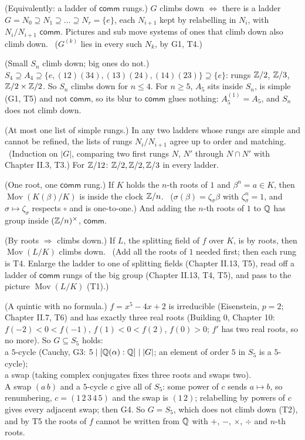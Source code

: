 \begin{lines}
\item[\lab{T1}] (Equivalently: a ladder of $\mathsf{comm}$ rungs.) $G$ climbs down $\iff$ there is a ladder $G = N_0 \supseteq N_1 \supseteq \dots \supseteq N_r = \{e\}$, each $N_{i+1}$ kept by relabelling in $N_i$, with $N_i / N_{i+1}$ $\mathsf{comm}$. Pictures and sub move systems of ones that climb down also climb down. \ ($G^{(k)}$ lies in every such $N_k$, by G1, T4.)
\item[\lab{T2}] (Small $S_n$ climb down; big ones do not.) $S_4 \supseteq A_4 \supseteq \{e, (12)(34), (13)(24), (14)(23)\} \supseteq \{e\}$: rungs $\mathbb{Z}/2$, $\mathbb{Z}/3$, $\mathbb{Z}/2 \times \mathbb{Z}/2$. So $S_n$ climbs down for $n \le 4$. For $n \ge 5$, $A_5$ sits inside $S_n$, is simple (G1, T5) and not $\mathsf{comm}$, so its blur to $\mathsf{comm}$ glues nothing: $A_5^{(1)} = A_5$, and $S_n$ does not climb down.
\item[\lab{T3}] (At most one list of simple rungs.) In any two ladders whose rungs are simple and cannot be refined, the lists of rungs $N_i / N_{i+1}$ agree up to order and matching. \ (Induction on $|G|$, comparing two first rungs $N$, $N'$ through $N \cap N'$ with Chapter II.3, T3.) For $\mathbb{Z}/12$: $\mathbb{Z}/2, \mathbb{Z}/2, \mathbb{Z}/3$ in every ladder.
\item[\lab{T4}] (One root, one $\mathsf{comm}$ rung.) If $K$ holds the $n$-th roots of $1$ and $\beta^n = a \in K$, then $\operatorname{Mov}(K(\beta)/K)$ is inside the clock $\mathbb{Z}/n$. \ ($\sigma(\beta) = \zeta_\sigma \beta$ with $\zeta_\sigma^n = 1$, and $\sigma \mapsto \zeta_\sigma$ respects $\circ$ and is one-to-one.) And adding the $n$-th roots of $1$ to $\mathbb{Q}$ has group inside $(\mathbb{Z}/n)^\times$, $\mathsf{comm}$.
\item[\lab{T5}] (By roots $\Rightarrow$ climbs down.) If $L$, the splitting field of $f$ over $K$, is by roots, then $\operatorname{Mov}(L/K)$ climbs down. \ (Add all the roots of $1$ needed first; then each rung is T4. Enlarge the ladder to one of splitting fields (Chapter II.13, T5), read off a ladder of $\mathsf{comm}$ rungs of the big group (Chapter II.13, T4, T5), and pass to the picture $\operatorname{Mov}(L/K)$ (T1).)
\item[\lab{T6}] (A quintic with no formula.) $f = x^5 - 4x + 2$ is irreducible (Eisenstein, $p = 2$; Chapter II.7, T6) and has exactly three real roots (Building 0, Chapter 10: $f(-2) < 0 < f(-1)$, $f(1) < 0 < f(2)$, $f(0) > 0$; $f'$ has two real roots, so no more). So $G \subseteq S_5$ holds: \\
a $5$-cycle (Cauchy, G3: $5 \mid [\mathbb{Q}(\alpha) : \mathbb{Q}] \mid |G|$; an element of order $5$ in $S_5$ is a $5$-cycle); \\
a swap (taking complex conjugates fixes three roots and swaps two). \\
A swap $(a\, b)$ and a $5$-cycle $c$ give all of $S_5$: some power of $c$ sends $a \mapsto b$, so renumbering, $c = (1\,2\,3\,4\,5)$ and the swap is $(1\,2)$; relabelling by powers of $c$ gives every adjacent swap; then G4. So $G = S_5$, which does not climb down (T2), and by T5 the roots of $f$ cannot be written from $\mathbb{Q}$ with $+$, $-$, $\times$, $\div$ and $n$-th roots.
\end{lines}

